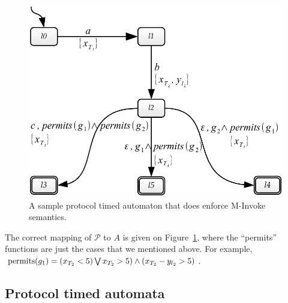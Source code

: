 \begin{figure}[htbp]
    \centering
    \includegraphics[width=\textwidth]{content/protocol-model/bogus-pta-constraint-fixed}
    \caption{A sample protocol timed automaton that does enforce M-Invoke semantics.}
    \label{fig:bogus-pta-constraint-fixed}
\end{figure}

The correct mapping of $\mathcal{P}$ to $A$ is given on Figure~\ref{fig:bogus-pta-constraint-fixed}, where the ``permits'' functions are just the cases that we mentioned above. For example, $\operatorname{permits}(g_1) = (x_{T_2} < 5) \bigvee x_{T_2} > 5) \wedge (x_{T_2} - y_{l_2} > 5)$.


\subsection{Protocol timed automata}


